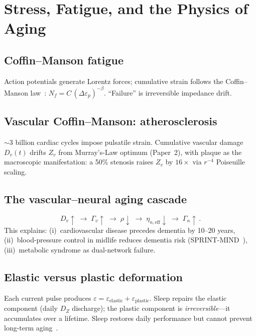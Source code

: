 \documentclass[aps,pre,twocolumn,superscriptaddress,floatfix]{revtex4-2}
\begin{document}
\section{Stress, Fatigue, and the Physics of Aging}
\label{sec:aging}

\subsection{Coffin--Manson fatigue}

Action potentials generate Lorentz forces; cumulative
strain follows the Coffin--Manson law~\cite{Coffin1954}:
$N_f = C\,(\Delta\varepsilon_p)^{-\beta}$.
``Failure'' is irreversible impedance drift.

\subsection{Vascular Coffin--Manson: atherosclerosis}

$\sim$3 billion cardiac cycles impose pulsatile strain.
Cumulative vascular damage $D_v(t)$ drifts $Z_v$ from
Murray's-Law optimum (Paper~2), with plaque as the
macroscopic manifestation:
a 50\% stenosis raises $Z_v$ by $16\times$ via
$r^{-4}$ Poiseuille scaling.

\subsection{The vascular--neural aging cascade}

\begin{equation}
  D_v\!\uparrow \;\to\;
    \Gamma_v\!\uparrow \;\to\;
    \rho\!\downarrow \;\to\;
    \eta_{n,\mathrm{eff}}\!\downarrow \;\to\;
    \Gamma_n\!\uparrow\,.
  \label{eq:aging-cascade}
\end{equation}
This explains:
(i)~cardiovascular disease precedes dementia by 10--20 years,
(ii)~blood-pressure control in midlife reduces dementia risk
(SPRINT-MIND~\cite{sprint2019}),
(iii)~metabolic syndrome as dual-network failure.

\subsection{Elastic versus plastic deformation}

Each current pulse produces $\varepsilon = \varepsilon_{\mathrm{elastic}}
+ \varepsilon_{\mathrm{plastic}}$.
Sleep repairs the elastic component (daily $D_Z$ discharge);
the plastic component is \emph{irreversible}---it accumulates
over a lifetime.
Sleep restores daily performance but cannot prevent
long-term aging~\cite{Walker2017}.
\end{document}
